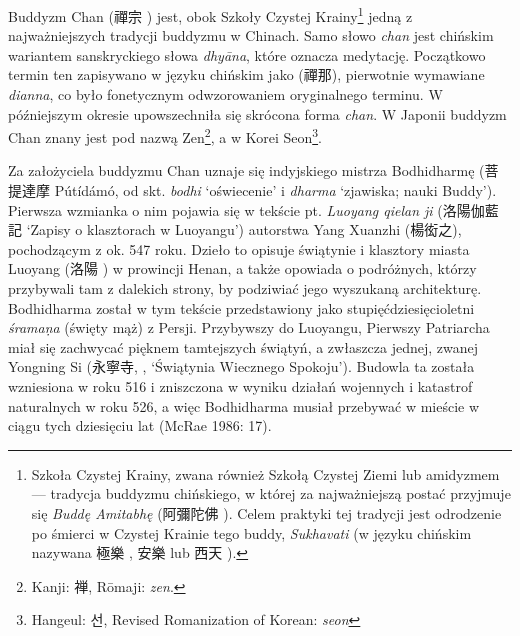 \introduction
Buddyzm Chan (禪宗 ) jest, obok Szkoły Czystej Krainy\footnote{Szkoła Czystej Krainy, zwana również Szkołą Czystej Ziemi lub amidyzmem --- tradycja buddyzmu chińskiego, w której za najważniejszą postać przyjmuje się \textit{Buddę Amitabhę} (阿彌陀佛 ). Celem praktyki tej tradycji jest odrodzenie po śmierci w Czystej Krainie tego buddy, \textit{Sukhavati} (w języku chińskim nazywana 極樂 , 安樂  lub 西天 ).} %
 jedną z najważniejszych tradycji buddyzmu w Chinach. Samo słowo \textit{chan} jest chińskim wariantem %
sanskryckiego słowa \textit{dhyāna}, które oznacza medytację.
Początkowo termin ten zapisywano w języku chińskim jako  (禪那), pierwotnie wymawiane \textit{dianna}, co było fonetycznym odwzorowaniem oryginalnego terminu. W późniejszym okresie upowszechniła się skrócona forma \textit{chan}.
W Japonii buddyzm Chan znany jest pod nazwą Zen\footnote{Kanji: {\ipaexgothic 禅}, Rōmaji: \textit{zen}.}, a w Korei Seon\footnote{Hangeul: {\Korean 선}, Revised Romanization of Korean: \textit{seon}}.

Za założyciela buddyzmu Chan uznaje się indyjskiego mistrza Bodhidharmę (菩提達摩 Pútídámó, od skt. \textit{bodhi} `oświecenie' i \textit{dharma} `zjawiska; nauki Buddy').
Pierwsza wzmianka o nim pojawia się w tekście pt. \textit{Luoyang qielan ji} (洛陽伽藍記  `Zapisy o klasztorach w Luoyangu') autorstwa Yang Xuanzhi (楊衒之), pochodzącym z ok. 547 roku.
Dzieło to opisuje świątynie i klasztory miasta Luoyang (洛陽 ) w prowincji Henan, a także opowiada o podróżnych, którzy przybywali tam z dalekich strony, by podziwiać jego wyszukaną architekturę.
Bodhidharma został w tym tekście przedstawiony jako stupięćdziesięcioletni \textit{śrama\d{n}a} (święty mąż) z Persji.
Przybywszy do Luoyangu, Pierwszy Patriarcha miał się zachwycać pięknem tamtejszych świątyń, a zwłaszcza jednej, zwanej Yongning Si (永寧寺, , `Świątynia Wiecznego Spokoju').
Budowla ta została wzniesiona w roku 516 i zniszczona w wyniku działań wojennych i katastrof naturalnych w roku 526, a więc Bodhidharma musiał przebywać w mieście w ciągu tych dziesięciu lat
(McRae 1986: 17).

